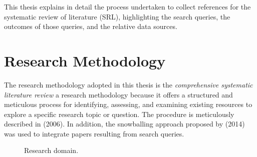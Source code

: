 This thesis explains in detail the process undertaken to collect references for the systematic review of literature (SRL), highlighting the search queries, the outcomes of those queries, and the relative data sources. 

\section{Research Methodology}
\label{sec:resmetodologies}
The research methodology adopted in this thesis is the \emph{comprehensive systematic literature review} a research methodology because it offers a structured and meticulous process for identifying, assessing, and examining existing resources to explore a specific research topic or question. The procedure is meticulously described in \citeauthor{budgen_performing_2006} (2006). In addition, the snowballing approach proposed by \citeauthor{wohlin_guidelines_2014} (2014) was used to integrate papers resulting from search queries.
\begin{figure}
\begin{center}
\end{center}
\caption{Research domain.} \label{fig:resdomains}
\end{figure}

